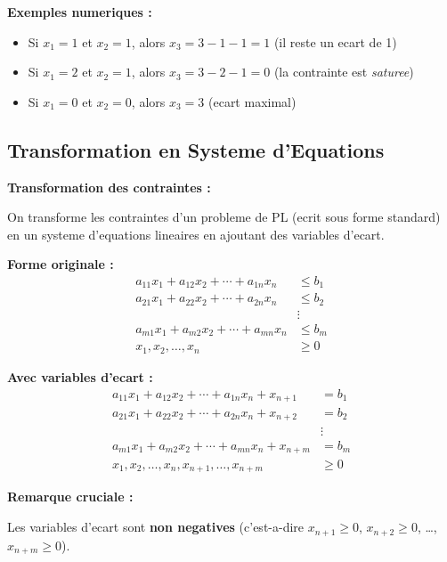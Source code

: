 \documentclass[12pt,a4paper]{article}
\begin{document}
\begin{exemple}
\textbf{Exemples numeriques :}

\begin{itemize}
    \item Si $x_1 = 1$ et $x_2 = 1$, alors $x_3 = 3 - 1 - 1 = 1$ (il reste un ecart de 1)
    \item Si $x_1 = 2$ et $x_2 = 1$, alors $x_3 = 3 - 2 - 1 = 0$ (la contrainte est \textit{saturee})
    \item Si $x_1 = 0$ et $x_2 = 0$, alors $x_3 = 3$ (ecart maximal)
\end{itemize}
\end{exemple}

\newpage
\subsection{Transformation en Systeme d'Equations}

\begin{methode}
\textbf{Transformation des contraintes :}

On transforme les contraintes d'un probleme de PL (ecrit sous forme standard) en un systeme d'equations lineaires en ajoutant des variables d'ecart.

\textbf{Forme originale :}
\begin{align*}
a_{11}x_1 + a_{12}x_2 + \cdots + a_{1n}x_n &\leq b_1\\
a_{21}x_1 + a_{22}x_2 + \cdots + a_{2n}x_n &\leq b_2\\
&\vdots\\
a_{m1}x_1 + a_{m2}x_2 + \cdots + a_{mn}x_n &\leq b_m\\
x_1, x_2, \ldots, x_n &\geq 0
\end{align*}

\textbf{Avec variables d'ecart :}
\begin{align*}
a_{11}x_1 + a_{12}x_2 + \cdots + a_{1n}x_n + x_{n+1} &= b_1\\
a_{21}x_1 + a_{22}x_2 + \cdots + a_{2n}x_n + x_{n+2} &= b_2\\
&\vdots\\
a_{m1}x_1 + a_{m2}x_2 + \cdots + a_{mn}x_n + x_{n+m} &= b_m\\
x_1, x_2, \ldots, x_n, x_{n+1}, \ldots, x_{n+m} &\geq 0
\end{align*}
\end{methode}

\begin{important}
\textbf{Remarque cruciale :}

Les variables d'ecart sont \textcolor{importantrouge}{\textbf{non negatives}} (c'est-a-dire $x_{n+1} \geq 0$, $x_{n+2} \geq 0$, \ldots, $x_{n+m} \geq 0$).
\end{important}
\end{document}
